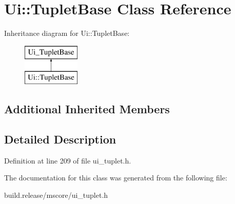\hypertarget{class_ui_1_1_tuplet_base}{}\section{Ui\+:\+:Tuplet\+Base Class Reference}
\label{class_ui_1_1_tuplet_base}
Inheritance diagram for Ui\+:\+:Tuplet\+Base\+:\begin{figure}[H]
\begin{center}
\leavevmode
\includegraphics[height=2.000000cm]{class_ui_1_1_tuplet_base}
\end{center}
\end{figure}
\subsection*{Additional Inherited Members}


\subsection{Detailed Description}


Definition at line 209 of file ui\+\_\+tuplet.\+h.



The documentation for this class was generated from the following file\+:\begin{DoxyCompactItemize}
\item 
build.\+release/mscore/ui\+\_\+tuplet.\+h\end{DoxyCompactItemize}
